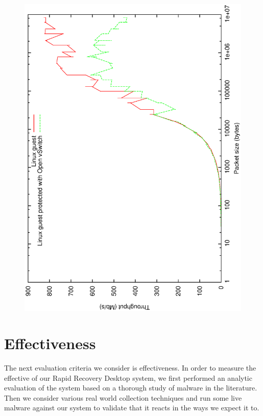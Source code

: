 \begin{figure}[tbp]
\begin{centering}
\label{fig:linux-network-ovs}
\includegraphics[scale=.7]{figs/linux-network-ovs}
\end{centering}
\end{figure}

\section{Effectiveness}

The next evaluation criteria we consider is effectiveness. In order to measure the effective of our Rapid Recovery Desktop system, we first performed an analytic evaluation of the system based on a thorough study of malware in the literature. Then we consider various real world collection techniques and run some live malware against our system to validate that it reacts in the ways we expect it to.

